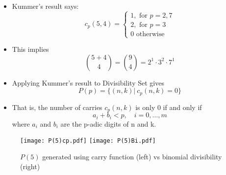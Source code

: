 \documentclass{beamer}
\begin{document}
\begin{frame}
    \begin{itemize}
        
        \item Kummer's result says:
        \begin{equation*}
            c_{p}(5,4)=\left\{\begin{array}{l}{1, \text { for } p=2,7} \\
            {2, \text { for } p=3 } \\
        {0 \text{ otherwise }}\end{array}\right.
        \end{equation*}
        \item This implies 
        \begin{equation*}
            \binom{5+4}{4} = \binom{9}{4} = 2^1 \cdot 3^2 \cdot 7^1
        \end{equation*}
    \end{itemize}
\end{frame}

\begin{frame}
    \begin{itemize}
        \item Applying Kummer's result to Divisibility Set gives 
        \begin{equation*}
            P(p) = \{(n,k) | \ c_p(n,k) = 0\}
        \end{equation*}
        \item That is, the number of carries $c_p(n,k)$ is only $0$ if and only if 
        \begin{equation*}
            a_i + b_i < p, \quad i = 0,\dots,m
        \end{equation*}
        where $a_i$ and $b_i$ are the p-adic digits of n and k. 
    \end{itemize}
\end{frame}

\begin{frame}
    \begin{figure}
        \texttt{[image: P(5)cp.pdf]}
        \hfill
        \texttt{[image: P(5)Bi.pdf]}
        \caption{$P(5)$ generated using carry function (left) vs binomial divisibility (right)}
    \end{figure}
        
\end{frame}
\end{document}
